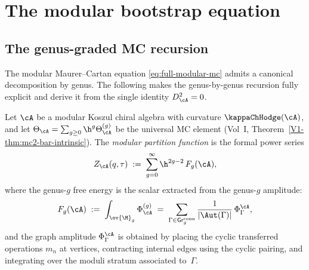 
\providecommand{\Cone}{\operatorname{Cone}}
\providecommand{\gr}{\operatorname{gr}}


\section{The modular bootstrap equation}

\subsection{The genus-graded MC recursion}

The modular Maurer--Cartan equation \eqref{eq:full-modular-mc} admits a canonical
decomposition by genus. The following makes the genus-by-genus recursion fully explicit and
derive it from the single identity $D_\cA^2 = 0$.

\begin{definition}
Let $\cA$ be a modular Koszul chiral algebra with curvature $\kappaChHodge(\cA)$, and let
$\Theta_\cA = \sum_{g \geq 0} \h^g \Theta_\cA^{(g)}$ be the universal MC element
(Vol~I, Theorem~\ref*{V1-thm:mc2-bar-intrinsic}). The \emph{modular partition function}
is the formal power series
\begin{equation}
Z_\cA(q,\tau)
\;:=\;
\sum_{g=0}^{\infty} \h^{2g-2}\,F_g(\cA),
\end{equation}
where the genus-$g$ free energy is the scalar extracted from the genus-$g$ amplitude:
\begin{equation}
F_g(\cA)
\;:=\;
\int_{\ov{\M}_g} \Phi^{(g)}_\cA
\;=\;
\sum_{\Gamma \in \mathsf{Gr}^{\mathrm{conn}}_g}
\frac{1}{|\Aut(\Gamma)|}\,
\Phi^\cA_\Gamma,
\end{equation}
and the graph amplitude $\Phi^\cA_\Gamma$ is obtained by placing the cyclic
transferred operations $m_n$ at vertices, contracting internal edges using the
cyclic pairing, and integrating over the moduli stratum associated to~$\Gamma$.
\end{definition}

